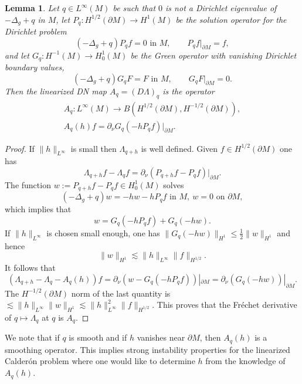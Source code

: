 \documentclass[12pt,twoside]{amsart}
\numberwithin{equation}{section}
\renewcommand{\leq}{\leqslant}
\newtheorem{lemma}[theorem]{Lemma}
\newcommand {\p} {\partial}
\newcommand{\norm}[1]{\lVert #1 \rVert}         %
\begin{document}
\begin{lemma} \label{lem:lin_Cal}
Let $q \in L^{\infty}(M)$ be such that $0$ is not a Dirichlet eigenvalue of $-\Delta_g+q$ in $M$, let $P_q: H^{1/2}(\partial M) \to H^1(M)$ be the solution operator for the Dirichlet problem 
\[
(-\Delta_g +q)P_q f = 0 \text{ in $M$}, \qquad P_q f|_{\p M} = f,
\]
and let $G_q: H^{-1}(M) \to H^1_0(M)$ be the Green operator with vanishing Dirichlet boundary values, 
\[
(-\Delta_g +q)G_q F = F \text{ in $M$}, \qquad G_q F|_{\p M} = 0.
\]
Then the linearized DN map $A_q = (D\Lambda)_q$ is the operator 
\begin{gather*}
A_q: L^{\infty}(M) \rightarrow B(H^{1/2}(\p M), H^{-1/2}(\p M)), \\
A_q(h) f = \p_{\nu} G_q(-h P_q f)|_{\partial M}.
\end{gather*}
\end{lemma}
\begin{proof}
If $\norm{h}_{L^{\infty}}$ is small then $\Lambda_{q+h}$ is well defined. Given $f \in H^{1/2}(\p M)$ one has 
\[
\Lambda_{q+h} f - \Lambda_q f = \p_{\nu}(P_{q+h} f - P_q f)|_{\p M}.
\]
The function $w := P_{q+h} f - P_q f \in H^1_0(M)$ solves 
\[
(-\Delta_g + q)w = -hw -h P_q f \mbox{ in } M, \ w = 0 \mbox{ on } \partial M,
\]
which implies that 
\[
w = G_q(-h P_q f) + G_q(-hw).
\]
If $\norm{h}_{L^{\infty}}$ is chosen small enough, one has $\norm{G_q(-hw)}_{H^1} \leq \frac{1}{2} \norm{w}_{H^1}$ and hence 
\[
\norm{w}_{H^1} \lesssim \norm{h}_{L^{\infty}} \norm{f}_{H^{1/2}}.
\]
It follows that 
\[
(\Lambda_{q+h} - \Lambda_q - A_q(h))f = \p_{\nu}(w - G_q(-h P_q f))|_{\p M} = \p_{\nu}(G_q(-hw))|_{\p M}.
\]
The $H^{-1/2}(\p M)$ norm of the last quantity is $\lesssim \norm{h}_{L^{\infty}} \norm{w}_{H^1} \lesssim \norm{h}_{L^{\infty}}^2 \norm{f}_{H^{1/2}}$. This proves that the Fr\'echet derivative of $q \mapsto \Lambda_q$ at $q$ is $A_q$.
\end{proof}

We note that if $q$ is smooth and if $h$ vanishes near $\p M$, then $A_q(h)$ is a smoothing operator. This implies strong instability properties for the linearized Calder\'on problem where one would like to determine $h$ from the knowledge of $A_q(h)$.
\end{document}
